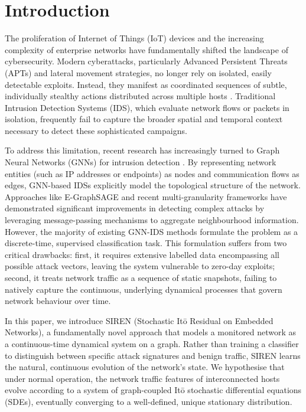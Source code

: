\section{Introduction}\label{sec:intro}

The proliferation of Internet of Things (IoT) devices and the increasing complexity of enterprise networks have fundamentally shifted the landscape of cybersecurity. Modern cyberattacks, particularly Advanced Persistent Threats (APTs) and lateral movement strategies, no longer rely on isolated, easily detectable exploits. Instead, they manifest as coordinated sequences of subtle, individually stealthy actions distributed across multiple hosts \cite{Moustafa2015unswnb15}. Traditional Intrusion Detection Systems (IDS), which evaluate network flows or packets in isolation, frequently fail to capture the broader spatial and temporal context necessary to detect these sophisticated campaigns.

To address this limitation, recent research has increasingly turned to Graph Neural Networks (GNNs) for intrusion detection \cite{Lo2022egraphsage, Zhang2026aedgnn}. By representing network entities (such as IP addresses or endpoints) as nodes and communication flows as edges, GNN-based IDSs explicitly model the topological structure of the network. Approaches like E-GraphSAGE \cite{Lo2022egraphsage} and recent multi-granularity frameworks \cite{Liu2025mgfgnn} have demonstrated significant improvements in detecting complex attacks by leveraging message-passing mechanisms to aggregate neighbourhood information. However, the majority of existing GNN-IDS methods formulate the problem as a discrete-time, supervised classification task. This formulation suffers from two critical drawbacks: first, it requires extensive labelled data encompassing all possible attack vectors, leaving the system vulnerable to zero-day exploits; second, it treats network traffic as a sequence of static snapshots, failing to natively capture the continuous, underlying dynamical processes that govern network behaviour over time.

In this paper, we introduce SIREN (Stochastic It\=o Residual on Embedded Networks), a fundamentally novel approach that models a monitored network as a continuous-time dynamical system on a graph. Rather than training a classifier to distinguish between specific attack signatures and benign traffic, SIREN learns the natural, continuous evolution of the network's state. We hypothesise that under normal operation, the network traffic features of interconnected hosts evolve according to a system of graph-coupled It\=o stochastic differential equations (SDEs), eventually converging to a well-defined, unique stationary distribution. 

